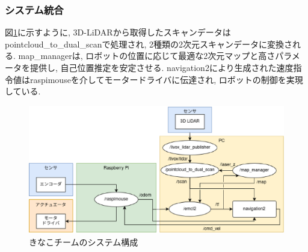 \subsubsection{システム統合}
図\ref{fig:kinako_system}に示すように, 3D-LiDARから取得したスキャンデータはpointcloud\_to\_dual\_scanで処理され, 2種類の2次元スキャンデータに変換される. 
map\_managerは, ロボットの位置に応じて最適な2次元マップと高さパラメータを提供し, 自己位置推定を安定させる. 
navigation2により生成された速度指令値はraspimouseを介してモータードライバに伝達され, ロボットの制御を実現している. 

\begin{figure}[h]
  \begin{center}
    \includegraphics[width=1.0\linewidth]{figs/kinako_system.eps}
    \caption{きなこチームのシステム構成}
    \label{fig:kinako_system}
  \end{center}
\end{figure}
